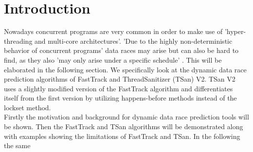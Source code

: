 \documentclass[12pt]{article}
\begin{document}
	\section{Introduction}\label{intro}
	Nowadays concurrent programs are very common in order to make use of 'hyper-threading and multi-core architectures'\cite[p. 14]{SWB-1830643851}. 'Due to the highly non-deterministic behavior of concurrent programs' \cite[p. 1]{sulzmann} data races may arise but can also be hard to find, as they also 'may only arise under a specific schedule' \cite[p. 1]{sulzmann}. This will be elaborated in the following section. We specifically look at the dynamic data race prediction algorithms of FastTrack and ThreadSanitizer (TSan) V2. TSan V2 uses a slightly modified version of the FastTrack algorithm and differentiates itself from the first version by utilizing happens-before methods instead of the lockset method.\\
	Firstly the motivation and background for dynamic data race prediction tools will be shown. Then the FastTrack and TSan algorithms will be demonstrated along with examples showing the limitations of FastTrack and TSan. In the following the same
\end{document}
